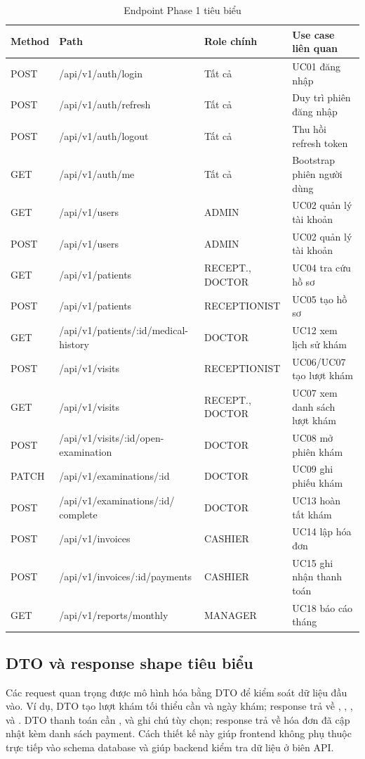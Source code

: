 \begin{longtable}{|p{2cm}|p{5.2cm}|p{3cm}|p{4.2cm}|}
\caption{Endpoint Phase 1 tiêu biểu}\\
\hline
\textbf{Method} & \textbf{Path} & \textbf{Role chính} & \textbf{Use case liên quan} \\
\hline
POST & /api/v1/auth/login & Tất cả & UC01 đăng nhập \\
\hline
POST & /api/v1/auth/refresh & Tất cả & Duy trì phiên đăng nhập \\
\hline
POST & /api/v1/auth/logout & Tất cả & Thu hồi refresh token \\
\hline
GET & /api/v1/auth/me & Tất cả & Bootstrap phiên người dùng \\
\hline
GET & /api/v1/users & ADMIN & UC02 quản lý tài khoản \\
\hline
POST & /api/v1/users & ADMIN & UC02 quản lý tài khoản \\
\hline
GET & /api/v1/patients & RECEPT., DOCTOR & UC04 tra cứu hồ sơ \\
\hline
POST & /api/v1/patients & RECEPTIONIST & UC05 tạo hồ sơ \\
\hline
GET & /api/v1/patients/:id/medical-history & DOCTOR & UC12 xem lịch sử khám \\
\hline
POST & /api/v1/visits & RECEPTIONIST & UC06/UC07 tạo lượt khám \\
\hline
GET & /api/v1/visits & RECEPT., DOCTOR & UC07 xem danh sách lượt khám \\
\hline
POST & /api/v1/visits/:id/open-examination & DOCTOR & UC08 mở phiên khám \\
\hline
PATCH & /api/v1/examinations/:id & DOCTOR & UC09 ghi phiếu khám \\
\hline
POST & /api/v1/examinations/:id/ complete & DOCTOR & UC13 hoàn tất khám \\
\hline
POST & /api/v1/invoices & CASHIER & UC14 lập hóa đơn \\
\hline
POST & /api/v1/invoices/:id/payments & CASHIER & UC15 ghi nhận thanh toán \\
\hline
GET & /api/v1/reports/monthly & MANAGER & UC18 báo cáo tháng \\
\hline
\end{longtable}

\subsection{DTO và response shape tiêu biểu}

Các request quan trọng được mô hình hóa bằng DTO để kiểm soát dữ liệu đầu vào. Ví dụ, DTO tạo lượt khám tối thiểu cần  và ngày khám; response trả về , , ,  và . DTO thanh toán cần ,  và ghi chú tùy chọn; response trả về hóa đơn đã cập nhật kèm danh sách payment. Cách thiết kế này giúp frontend không phụ thuộc trực tiếp vào schema database và giúp backend kiểm tra dữ liệu ở biên API.

